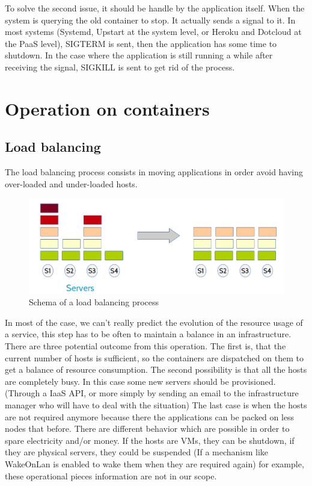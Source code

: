 To solve the second issue, it should be handle by the application itself. When
the system is querying the old container to stop. It actually sends a signal to
it.  In most systems (Systemd, Upstart at the system level, or Heroku and
Dotcloud at the PaaS level), SIGTERM is sent, then the application has some
time to shutdown. In the case where the application is still running a while
after receiving the signal, SIGKILL is sent to get rid of the process.

\section{Operation on containers}

\subsection{Load balancing}

The load balancing process consists in moving applications in order avoid having
over-loaded and under-loaded hosts.

\begin{figure}[h!]
	\includegraphics[width=\textwidth]{./Images/loadbalancing.png}
	\caption{Schema of a load balancing process}
\end{figure}

In most of the case, we can't really predict the evolution of the resource usage
of a service, this step has to be often to maintain a balance in an
infrastructure.  There are three potential outcome from this operation. The
first is, that the current number of hosts is sufficient, so the containers are
dispatched on them to get a balance of resource consumption. The second
possibility is that all the hosts are completely busy. In this case some new
servers should be provisioned. (Through a IaaS API, or more simply by sending
an email to the infrastructure manager who will have to deal with the
situation) The last case is when the hosts are not required anymore because
there the applications can be packed on less nodes that before. There are
different behavior which are possible in order to spare electricity and/or
money. If the hosts are VMs, they can be shutdown, if they are physical
servers, they could be suspended (If a mechanism like WakeOnLan is enabled to
wake them when they are required again) for example, these operational pieces
information are not in our scope.

